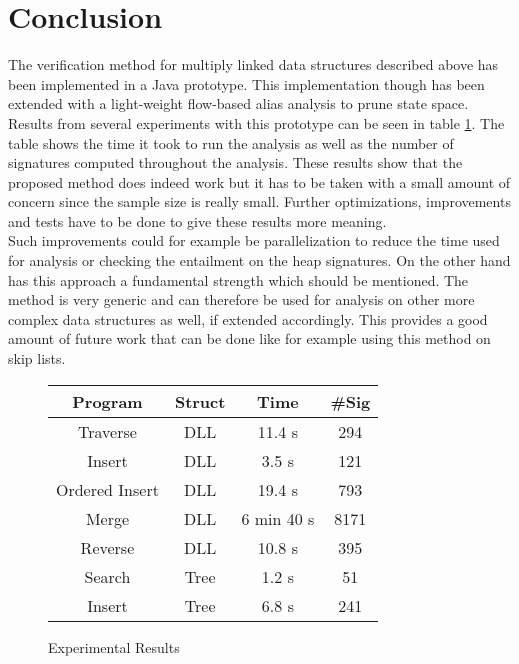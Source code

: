 \newpage
\section{Conclusion}
\label{sec:conclusion}
The verification method for multiply linked data structures described above has been implemented in a Java prototype.
This implementation though has been extended with a light-weight flow-based alias analysis to prune state space.
Results from several experiments with this prototype can be seen in table \ref{Results}. The table shows the time it took to run the analysis as well
as the number of signatures computed throughout the analysis. These results show that the proposed method does indeed work but
it has to be taken with a small amount of concern since the sample size is really small. Further optimizations, improvements and tests
have to be done to give these results more meaning.\\
Such improvements could for example be parallelization to reduce
the time used for analysis or checking the entailment on the heap
signatures.
On the other hand has this approach a fundamental strength which should be mentioned. The method is very generic and can therefore be 
used for analysis on other more complex data structures as well, if extended accordingly. This provides a good amount of future work that can be done like for example using this method on skip lists.

\begin{figure}[htb]
\caption{Experimental Results}
\label{Results}
\begin{center}
\begin{tabular}{|c|c|c|c|}

\hline
Program & Struct & Time & \#Sig \\
\hline 
Traverse & DLL & 11.4 s & 294 \\
\hline
Insert & DLL & 3.5 s & 121 \\
\hline
Ordered Insert & DLL & 19.4 s & 793 \\
\hline
Merge & DLL & 6 min 40 s & 8171 \\
\hline
Reverse & DLL & 10.8 s & 395 \\
\hline
Search & Tree & 1.2 s & 51 \\
\hline
Insert & Tree & 6.8 s & 241 \\
\hline
\end{tabular}
\end{center}
\end{figure}




\begin{comment}
Give a conclusion on your topic. Give a few sentences to summarize 
the topic. If possible, point out the quality of the result and give
a small prospect of subsequent works.
\end{comment}